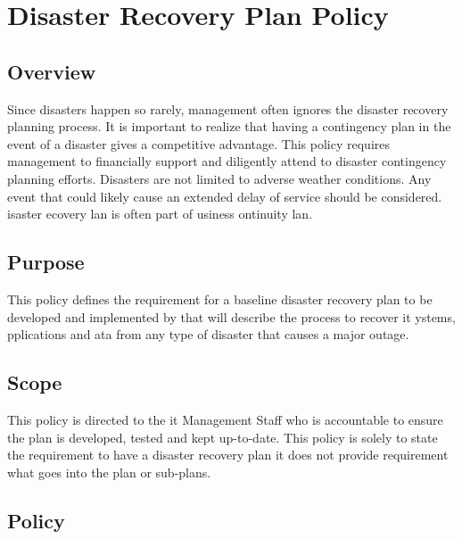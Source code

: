 \chapter{Disaster Recovery Plan Policy}
\CommonIntroduction
\section{Overview}
Since disasters happen so rarely, management often ignores the disaster recovery planning process.  
It is important to realize that having a contingency plan in the event of a disaster gives \CompanyName{} a competitive advantage.  
This policy requires management to financially support and diligently attend to disaster contingency planning efforts.  
Disasters are not limited to adverse weather conditions.  
Any event that could likely cause an extended delay of service should be considered.  
 isaster ecovery lan is often part of  usiness ontinuity lan.
\section{Purpose}
This policy defines the requirement for a baseline disaster recovery plan to be developed and implemented by \CompanyName{} that will describe the process to recover \gls{it} ystems, pplications\oxford{} and ata from any type of disaster that causes a major outage.
\section{Scope}
This policy is directed to the \gls{it} Management Staff who is accountable to ensure the plan is developed, tested\oxford{} and kept up-to-date.  
This policy is solely to state the requirement to have a disaster recovery plan\oldnew{,}{ -} it does not provide requirement what goes into the plan or sub-plans.
\section{Policy}
